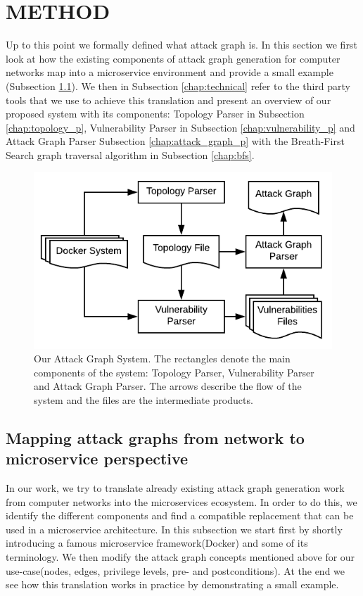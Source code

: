 \section{METHOD}
Up to this point we formally defined what attack graph is. In this section we first look at how the existing components of attack graph generation for computer networks map into a microservice environment  and provide a small example (Subsection \ref{chap:mapping}). We then in Subsection \ref{chap:technical} refer to the third party tools that we use to achieve this translation and present an overview of our proposed system with its components: Topology Parser in Subsection \ref{chap:topology_p}, Vulnerability Parser in Subsection \ref{chap:vulnerability_p} and Attack Graph Parser Subsection \ref{chap:attack_graph_p} with the Breath-First Search graph traversal algorithm in Subsection \ref{chap:bfs}. 


\begin{figure}
	\includegraphics[scale=0.9]{./images/AttackGraphSystem}
	\caption{Our Attack Graph System. The rectangles denote the main components of the system: Topology Parser, Vulnerability Parser and Attack Graph Parser. The arrows describe the flow of the system and the files are the intermediate products.}
	\label{AttackGraphSystem}
\end{figure}

\subsection{Mapping attack graphs from network to microservice perspective}
\label{chap:mapping}

In our work, we try to translate already existing attack graph generation work from computer networks into the microservices ecosystem. In order to do this, we identify the different components and find a compatible replacement that can be used in a microservice architecture. In this subsection we start first by shortly introducing a famous microservice framework(Docker) and some of its terminology. We then modify the attack graph concepts mentioned above for our use-case(nodes, edges, privilege levels, pre- and postconditions). At the end we see how this translation works in practice by demonstrating a small example.

